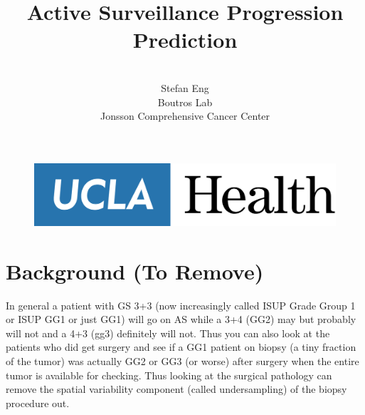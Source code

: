 \documentclass[]{article}
\title{\Huge Active Surveillance Progression Prediction}
\author{\\[1cm]
      Stefan Eng\\[1.5cm]
      Boutros Lab\\
      Jonsson Comprehensive Cancer Center\\
      }
\begin{document}
\begin{titlingpage}
\maketitle
\begin{figure}
    \centering
    \includegraphics[scale=0.03]{uclalogo.png}
    \label{fig:ucla_logo}
\end{figure}
\end{titlingpage}

\hypertarget{background-to-remove}{%
\section{Background (To Remove)}\label{background-to-remove}}

In general a patient with GS 3+3 (now increasingly called ISUP Grade Group 1 or ISUP GG1 or just GG1) will go on AS while a 3+4 (GG2) may but probably will not and a 4+3 (gg3) definitely will not. Thus you can also look at the patients who did get surgery and see if a GG1 patient on biopsy (a tiny fraction of the tumor) was actually GG2 or GG3 (or worse) after surgery when the entire tumor is available for checking. Thus looking at the surgical pathology can remove the spatial variability component (called undersampling) of the biopsy procedure out.
\end{document}
